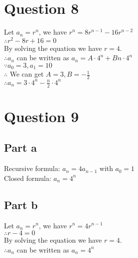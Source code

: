 \documentclass[11pt, oneside]{article}   	%
\begin{document}
\section*{Question 8}

	Let $a_{n}=r^{n}$, we have $r^{n}=8r^{n-1}-16r^{n-2}$\\
	$\therefore r^{2}-8r+16=0$\\
	By solving the equation we have $r=4$.\\
	$\therefore a_{n}$ can be written as $a_{n}=A\cdot4^{n}+Bn\cdot4^{n}$\\
	$\because a_{0}=3,a_{1}=10$\\
	$\therefore$ We can get $A=3,B=-\frac{1}{2}$\\
	$\therefore a_{n}=3\cdot4^{n}-\frac{n}{2}\cdot4^{n}$

\section*{Question 9}

	\subsection*{Part a}
	Recursive formula: $a_{n}=4a_{n-1}$ with $a_{0}=1$\\
	Closed formula: $a_{n}=4^{n}$\\
	\subsection*{Part b}
	Let $a_{n}=r^{n}$, we have $r^{n}=4r^{n-1}$\\
	$\therefore r-4=0$\\
	By solving the equation we have $r=4$.\\
	$\therefore a_{n}$ can be written as $a_{n}=4^{n}$
\end{document}
